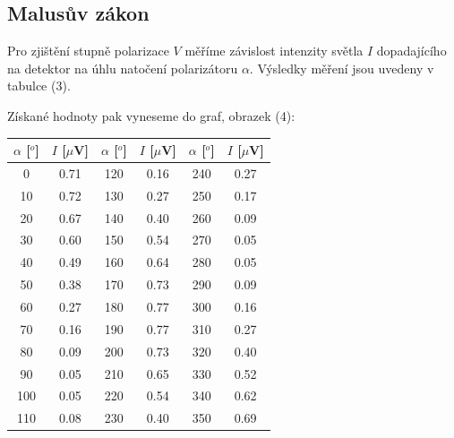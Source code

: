 \documentclass[a4paper,11pt]{article}
\begin{document}
\begin{minipage}[t]{0.5\textwidth}
            \subsection{Malusův zákon}
                \par Pro zjištění stupně polarizace $V$ měříme závislost intenzity světla $I$ dopadajícího na detektor na úhlu natočení polarizátoru $\alpha$. Výsledky měření jsou uvedeny v tabulce (3). 
                \par Získané hodnoty pak vyneseme do graf, obrazek (4): 
                \vspace{5pt}
                \par \centering
                \begin{tabular}{|c|c|c|c|c|c|}
                    \hline
                    $\alpha$ [$^o$] & $I$ [$\mu$V] & $\alpha$ [$^o$] & $I$ [$\mu$V] & $\alpha$ [$^o$] & $I$ [$\mu$V] \\
                    \hline
                    0 & 0.71 & 120 & 0.16 & 240 & 0.27 \\
                    \hline
                    10 & 0.72 & 130 & 0.27 & 250 & 0.17 \\
                    \hline
                    20 & 0.67 & 140 & 0.40 & 260 & 0.09 \\
                    \hline
                    30 & 0.60 & 150 & 0.54 & 270 & 0.05 \\
                    \hline
                    40 & 0.49 & 160 & 0.64 & 280 & 0.05 \\
                    \hline
                    50 & 0.38 & 170 & 0.73 & 290 & 0.09 \\
                    \hline
                    60 & 0.27 & 180 & 0.77 & 300 & 0.16 \\
                    \hline
                    70 & 0.16 & 190 & 0.77 & 310 & 0.27 \\
                    \hline
                    80 & 0.09 & 200 & 0.73 & 320 & 0.40 \\
                    \hline
                    90 & 0.05 & 210 & 0.65 & 330 & 0.52 \\
                    \hline
                    100 & 0.05 & 220 & 0.54 & 340 & 0.62 \\
                    \hline
                    110 & 0.08 & 230 & 0.40 & 350 & 0.69 \\
                    \hline
                \end{tabular}
                \captionsetup{justification=centering, font=footnotesize}
                \vspace{10pt}
                \raggedright
    \end{minipage}
\end{document}
